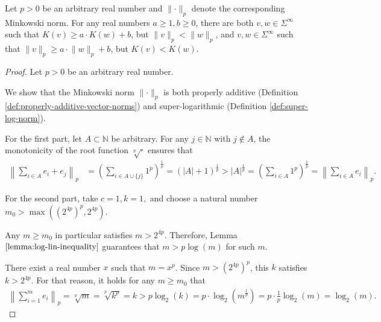 \begin{corollary}
	Let $p>0$ be an arbitrary real number and $\lVert\cdot\rVert_p$ denote the corresponding Minkowski norm.
	For any real numbers $a\geq 1, b\geq 0$, there are both $v,w\in\Sigma^{\infty}$ such that $K(v)\geq a\cdot K(w)+b$, but $\lVert v \rVert_p < \lVert w \rVert_p $, and $v,w\in\Sigma^{\infty}$ such that $\lVert v \rVert_p \geq a\cdot \lVert w \rVert_p+b$, but $K(v) < K(w)$. 
\end{corollary}
\begin{proof}
	Let $p>0$ be an arbitrary real number.
	
	We show that the Minkowski norm $\lVert\cdot\rVert_p$ is both properly additive (Definition \ref{def:properly-additive-vector-norms}) and super-logarithmic (Definition \ref{def:super-log-norm}).
	
	For the first part, let $A\subset \mathbb{N}$ be arbitrary.
	For any $j\in\mathbb{N}$ with $j\notin A$, the monotonicity of the root function $\sqrt[p]{\cdot}$ ensures that
	\begin{align}
		\left\lVert \sum_{i\in A} e_i + e_j \right\rVert_p &= \left(\sum_{i\in A\cup\{j\}} 1^p \right)^{\frac{1}{p}} = \left( |A|+1 \right)^{\frac{1}{p}} > |A|^{\frac{1}{p}} = \left(\sum_{i\in A} 1^p \right)^{\frac{1}{p}} = \left\lVert \sum_{i\in A} e_i \right\rVert_p.
	\end{align}
	
	For the second part, take $c=1,k=1,$ and choose a natural number $m_0>\max\left(\left(2^{4p}\right)^p,2^{4p}\right)$.
	
	Any $m\geq m_0$ in particular satisfies $m > 2^{4p}$.
	Therefore, Lemma $\ref{lemma:log-lin-inequality}$ guarantees that $m > p\log(m)$ for such $m$.
	
	There exist a real number $x$ such that $m=x^p$.
	Since $m>\left(2^{4p}\right)^p$, this $k$ satisfies $k>2^{4p}$. 
	For that reason, it holds for any $m\geq m_0$ that
	\begin{align}
		\left\lVert \sum_{i=1}^{m} e_i \right\rVert_p = \sqrt[p]{m} = \sqrt[p]{k^p} = k > p \log_2(k) = p\cdot \log_2(m^{\frac{1}{p}}) = p \cdot \frac{1}{p} \log_2(m)=\log_2(m).
	\end{align}
\end{proof}

